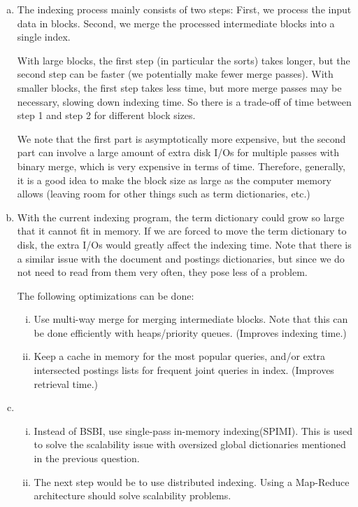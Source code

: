 \documentclass[10pt]{article}
\begin{document}
\begin{enumerate}[a)]
\item
The indexing process mainly consists of two steps: First, we process the input data in blocks. Second, we merge the processed intermediate blocks into a single index.

With large blocks, the first step (in particular the sorts) takes longer, but the second step can be faster (we potentially make fewer merge passes). With smaller blocks, the first step takes less time, but more merge passes may be necessary, slowing down indexing time. So there is a trade-off of time between step 1 and step 2 for different block sizes.

We note that the first part is asymptotically more expensive, but the second part can involve a large amount of extra disk I/Os for multiple passes with binary merge, which is very expensive in terms of time. Therefore, generally, it is a good idea to make the block size as large as the computer memory allows (leaving room for other things such as term dictionaries, etc.)

\item
With the current indexing program, the term dictionary could grow so large that it cannot fit in memory. If we are forced to move the term dictionary to disk, the extra I/Os would greatly affect the indexing time. Note that there is a similar issue with the document and postings dictionaries, but since we do not need to read from them very often, they pose less of a problem.

The following optimizations can be done:
\begin{enumerate}[(i)]
\item Use multi-way merge for merging intermediate blocks. Note that this can be done efficiently with heaps/priority queues. (Improves indexing time.)
\item Keep a cache in memory for the most popular queries, and/or extra intersected postings lists for frequent joint queries in index. (Improves retrieval time.)
\end{enumerate}
\item
\begin{enumerate}[(i)]
\item Instead of BSBI, use single-pass in-memory indexing(SPIMI). This is used to solve the scalability issue with oversized global dictionaries mentioned in the previous question.
\item The next step would be to use distributed indexing. Using a Map-Reduce architecture should solve scalability problems.
\end{enumerate}
\end{enumerate}
\end{document}
